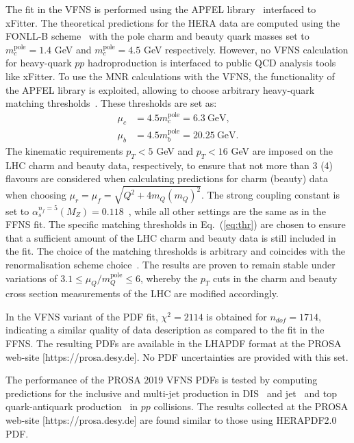 \documentclass[12pt]{article}
\begin{document}
The fit in the VFNS is performed using the APFEL library~\cite{Bertone:2013vaa} interfaced to xFitter.
The theoretical predictions for the HERA data are computed using the FONLL-B scheme~\cite{Forte:2010ta} with the pole charm and beauty quark masses set to $m_c^{\textrm{pole}} = 1.4$ GeV and $m_c^{\textrm{pole}} = 4.5$ GeV respectively.
However, no VFNS calculation for heavy-quark $pp$ hadroproduction is interfaced to public QCD analysis tools like xFitter.
To use the MNR calculations with the VFNS, the functionality of the APFEL library is exploited, allowing to choose arbitrary heavy-quark matching thresholds~\cite{Bertone:2017ehk}. These thresholds are set as:
\begin{equation}
\begin{aligned}
\mu_c &= 4.5m_c^{\textrm{pole}} = 6.3~\textrm{GeV},\\
\mu_b &= 4.5m_b^{\textrm{pole}} =  20.25~\textrm{GeV}.
\label{eq:thr}
\end{aligned}
\end{equation}
The kinematic requirements $p_T < 5$ GeV and $p_T < 16$ GeV are imposed on the LHC charm and beauty data, respectively, to ensure that not more than 3 (4) flavours are considered when calculating predictions for charm (beauty) data when choosing $\mu_r = \mu_f = \sqrt{Q^2 + 4m_Q(m_Q)^2}$.
The strong coupling constant is set to $\alpha_s^{n_f = 5}(M_Z) = 0.118$~\cite{Tanabashi:2018oca}, while all other settings are the same as in the FFNS fit.
The specific matching thresholds in Eq.~(\ref{eq:thr}) are chosen to ensure that a sufficient amount of the LHC charm and beauty data is still included in the fit.
The choice of the matching thresholds is arbitrary and coincides with the renormalisation scheme choice~\cite{Bertone:2017ehk}. 
The results are proven to remain stable under variations of $3.1 \le \mu_Q/m_Q^{\textrm{pole}} \le 6$, whereby the $p_T$  cuts in the charm and beauty cross section measurements of the LHC are modified accordingly. 

In the VFNS variant of the PDF fit, $\chi^2 = 2114$ is obtained for $n_{dof} = 1714$, indicating a similar quality of data description as compared to the fit in the FFNS. The resulting PDFs are available in the LHAPDF format at the PROSA web-site [https://prosa.desy.de]. No PDF uncertainties are provided with this set.

The performance of the PROSA 2019 VFNS PDFs is tested by computing predictions for the inclusive and multi-jet production in DIS~\cite{Chekanov:2002be,Chekanov:2006xr,Abramowicz:2010cka,Aktas:2007aa,Aaron:2010ac} 
and jet~\cite{Chatrchyan:2012bja} and top quark-antiquark production~\cite{Sirunyan:2017azo,Sirunyan:2019zvx} in $pp$ collisions. The results collected at the PROSA web-site [https://prosa.desy.de] are found similar to those using HERAPDF2.0 PDF.
\end{document}
